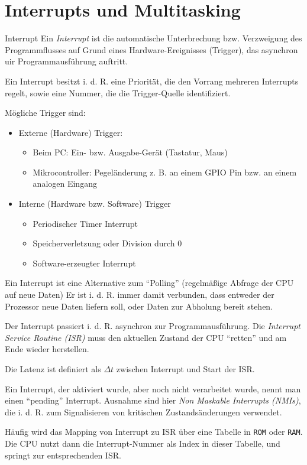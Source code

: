 \section{Interrupts und Multitasking}

\begin{defi}{Interrupt}
    Ein \emph{Interrupt} ist die automatische Unterbrechung bzw. Verzweigung des Programmflusses auf Grund eines Hardware-Ereignisses (Trigger), das asynchron uir Programmausführung auftritt.

    Ein Interrupt besitzt i. d. R. eine Priorität, die den Vorrang mehreren Interrupts regelt, sowie eine Nummer, die die Trigger-Quelle identifiziert.

    Mögliche Trigger sind:
    \begin{itemize}
        \item Externe (Hardware) Trigger:
              \begin{itemize}
                  \item Beim PC: Ein- bzw. Ausgabe-Gerät (Tastatur, Maus)
                  \item Mikrocontroller: Pegeländerung z. B. an einem GPIO Pin bzw. an einem analogen Eingang
              \end{itemize}
        \item Interne (Hardware bzw. Software) Trigger
              \begin{itemize}
                  \item Periodischer Timer Interrupt
                  \item Speicherverletzung oder Division durch 0
                  \item Software-erzeugter Interrupt
              \end{itemize}
    \end{itemize}

    Ein Interrupt ist eine Alternative zum \enquote{Polling} (regelmäßige Abfrage der CPU auf neue Daten)
    Er ist i. d. R. immer damit verbunden, dass entweder der Prozessor neue Daten liefern soll, oder Daten zur Abholung bereit stehen.

    Der Interrupt passiert i. d. R. asynchron zur Programmausführung.
    Die \emph{Interrupt Service Routine (ISR)} muss den aktuellen Zustand der CPU \enquote{retten} und am Ende wieder herstellen.

    Die Latenz ist definiert als $\Delta t$ zwischen Interrupt und Start der ISR.

    Ein Interrupt, der aktiviert wurde, aber noch nicht verarbeitet wurde, nennt man einen \enquote{pending} Interrupt.
    Ausnahme sind hier \emph{Non Maskable Interrupts (NMIs)}, die i. d. R. zum Signalisieren von kritischen Zustandsänderungen verwendet.

    Häufig wird das Mapping von Interrupt zu ISR über eine Tabelle in \texttt{ROM} oder \texttt{RAM}.
    Die CPU nutzt dann die Interrupt-Nummer als Index in dieser Tabelle, und springt zur entsprechenden ISR.
\end{defi}

